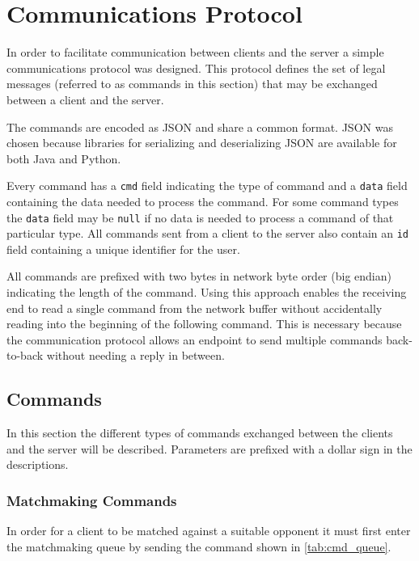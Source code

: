 \section{Communications Protocol}
\label{sec:com_protocol}
In order to facilitate communication between clients and the server a simple communications protocol was designed.
This protocol defines the set of legal messages (referred to as commands in this section) that may be exchanged between a client and the server.

The commands are encoded as JSON and share a common format.
JSON was chosen because libraries for serializing and deserializing JSON are available for both Java and Python.

Every command has a \texttt{cmd} field indicating the type of command and a \texttt{data} field containing the data needed to process the command.
For some command types the \texttt{data} field may be \texttt{null} if no data is needed to process a command of that particular type.
All commands sent from a client to the server also contain an \texttt{id} field containing a unique identifier for the user.

All commands are prefixed with two bytes in network byte order (big endian) indicating the length of the command.
Using this approach enables the receiving end to read a single command from the network buffer without accidentally reading into the beginning of the following command.
This is necessary because the communication protocol allows an endpoint to send multiple commands back-to-back without needing a reply in between.

\subsection{Commands}
In this section the different types of commands exchanged between the clients and the server will be described.
Parameters are prefixed with a dollar sign in the descriptions.

\subsubsection{Matchmaking Commands}
In order for a client to be matched against a suitable opponent it must first enter the matchmaking queue by sending the command shown in \autoref{tab:cmd_queue}.

\newenvironment{command}
{\bigskip\begin{minipage}{\textwidth}\hrule\begin{description}}
{\end{description}\hrule\end{minipage}\bigskip}

